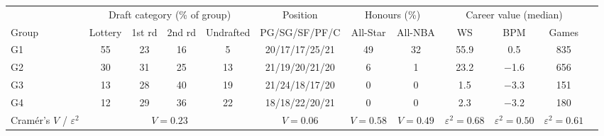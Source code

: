\begin{tabular}{lccccccccccc}\toprule
 & \multicolumn{4}{c}{Draft category (\% of group)} & Position & \multicolumn{2}{c}{Honours (\%)} & \multicolumn{3}{c}{Career value (median)} \\ \cmidrule(lr){2-5}\cmidrule(lr){6-6}\cmidrule(lr){7-8}\cmidrule(lr){9-11}
Group & Lottery & 1st rd & 2nd rd & Undrafted & PG/SG/SF/PF/C & All-Star & All-NBA & WS & BPM & Games \\ \midrule
G1 & 55 & 23 & 16 & 5 & 20/17/17/25/21 & 49 & 32 & 55.9 & 0.5 & 835 \\
G2 & 30 & 31 & 25 & 13 & 21/19/20/21/20 & 6 & 1 & 23.2 & $-$1.6 & 656 \\
G3 & 13 & 28 & 40 & 19 & 21/24/18/17/20 & 0 & 0 & 1.5 & $-$3.3 & 151 \\
G4 & 12 & 29 & 36 & 22 & 18/18/22/20/21 & 0 & 0 & 2.3 & $-$3.2 & 180 \\
\midrule Cram\'er's $V$ / $\varepsilon^2$ & \multicolumn{4}{c}{$V=0.23$} & $V=0.06$ & $V=0.58$ & $V=0.49$ & $\varepsilon^2=0.68$ & $\varepsilon^2=0.50$ & $\varepsilon^2=0.61$ \\
\bottomrule\end{tabular}